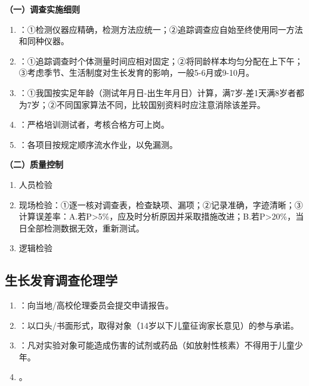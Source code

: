 \begin{keybox}
\textbf{（一）调查实施细则}

\begin{enumerate}[leftmargin=*]
    \item {}：①检测仪器应精确，检测方法应统一；②追踪调查应自始至终使用同一方法和同种仪器。
    \item {}：①追踪调查时个体测量时间应相对固定；②将同龄样本均匀分配在上下午；③考虑季节、生活制度对生长发育的影响，一般5-6月或9-10月。
    \item {}：①我国按实足年龄（测试年月日-出生年月日）计算，满7岁-差1天满8岁者都为7岁；②不同国家算法不同，比较国别资料时应注意消除该差异。
    \item {}：严格培训测试者，考核合格方可上岗。
    \item {}：各项目按规定顺序流水作业，以免漏测。
\end{enumerate}

\textbf{（二）质量控制}

\begin{enumerate}[leftmargin=*]
    \item 人员检验
    \item 现场检验：①逐一核对调查表，检查缺项、漏项；②记录准确，字迹清晰；③计算误差率：A.若P>5\%，应及时分析原因并采取措施改进；B.若P>20\%，当日全部检测数据无效，重新测试。
    \item 逻辑检验
\end{enumerate}
\end{keybox}

\subsection{生长发育调查伦理学}

\begin{defbox}
\begin{enumerate}[leftmargin=*]
    \item {}：向当地/高校伦理委员会提交申请报告。
    \item {}：以口头/书面形式，取得对象（14岁以下儿童征询家长意见）的参与承诺。
    \item {}：凡对实验对象可能造成伤害的试剂或药品（如放射性核素）不得用于儿童少年。
    \item {}。
\end{enumerate}
\end{defbox}

